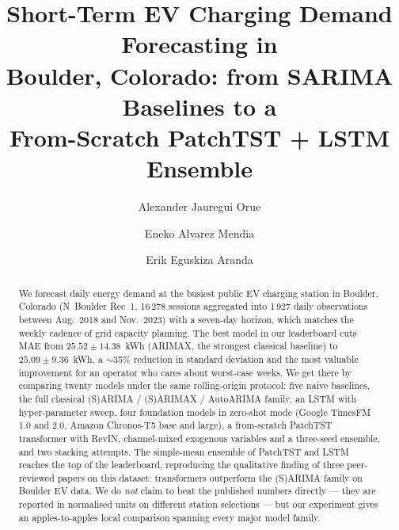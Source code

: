\documentclass[runningheads]{llncs}
\begin{document}
\title{Short-Term EV Charging Demand Forecasting in\\
Boulder, Colorado: from SARIMA Baselines to a\\
From-Scratch PatchTST + LSTM Ensemble}


\author{Alexander Jauregui Orue \and
Eneko Alvarez Mendia \and
Erik Eguskiza Aranda}



\maketitle

\begin{abstract}
We forecast daily energy demand at the busiest public EV charging station in
Boulder, Colorado (N~Boulder Rec~1, 16\,278 sessions aggregated into 1\,927
daily observations between Aug.~2018 and Nov.~2023) with a seven-day horizon,
which matches the weekly cadence of grid capacity planning. The best model in
our leaderboard cuts MAE from $25.52 \pm 14.38$~kWh (ARIMAX, the strongest
classical baseline) to $25.09 \pm 9.36$~kWh, a $\sim$35\% reduction in
standard deviation and the most valuable improvement for an operator who
cares about worst-case weeks. We get there by comparing twenty models under
the same rolling-origin protocol: five naive baselines, the full classical
(S)ARIMA / (S)ARIMAX / AutoARIMA family, an LSTM with hyper-parameter sweep,
four foundation models in zero-shot mode (Google TimesFM 1.0 and 2.0, Amazon
Chronos-T5 base and large), a from-scratch PatchTST transformer with RevIN,
channel-mixed exogenous variables and a three-seed ensemble, and two stacking
attempts. The simple-mean ensemble of PatchTST and LSTM reaches the top of
the leaderboard, reproducing the qualitative finding of three peer-reviewed
papers on this dataset: transformers outperform the (S)ARIMA family on
Boulder EV data. We do \emph{not} claim to beat the published numbers
directly --- they are reported in normalised units on different station
selections --- but our experiment gives an apples-to-apples local comparison
spanning every major model family.
\end{abstract}
\end{document}
